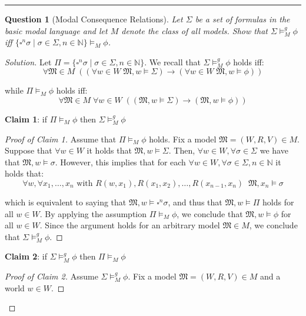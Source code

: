 \documentclass[12pt,a4paper]{report}
\newtheorem{question}{Question}
\theoremstyle{definition}
\newcommand{\N}{\mathbb{N}}                     %
\newcommand{\model}[1]{\mathfrak{#1}}           %
\begin{document}
    \quad

    \hrule

    \quad

    \newpage

    \begin{question}[Modal Consequence Relations]
        Let $\Sigma$ be a set of formulas in the basic modal language and let $M$ denote the class of all models. Show that $\Sigma \models^g_M \phi$ iff $\{\square^n \sigma \mid \sigma \in \Sigma, n \in \N\} \models_M \phi$.
    \end{question}

    \begin{proof}[Solution]
        Let $\Pi = \{\square^n \sigma \mid \sigma \in \Sigma, n \in \N\}$. We recall that $\Sigma \models^g_M \phi$ holds iff:
        \[\forall \model M \in M \; ((\forall w \in W \; \model M, w \models \Sigma) \to (\forall w \in W \; \model M, w \models \phi))\]

        while $\Pi \models_M \phi$ holds iff:
        \[\forall \model M \in M \; \forall w \in W \;((\model M, w \models \Sigma) \to (\model M, w \models \phi))\]

        \textbf{Claim 1}: if $\Pi \models_M \phi$ then $\Sigma \models^g_M \phi$

        \begin{proof}[Proof of Claim 1]
            Assume that $\Pi \models_M \phi$ holds. Fix a model $\model{M} = (W,R,V) \in M$. Suppose that $\forall w \in W$ it holds that $\model M, w \models \Sigma$. Then,  $\forall w \in W, \forall \sigma \in \Sigma$ we have that $\model M, w \models \sigma$. However, this implies that for each $\forall w \in W, \forall \sigma \in \Sigma, n \in \N$ it holds that:
            \[\forall w, \forall x_1, \ldots, x_n \text{ with } R(w,x_1), R(x_1, x_2), \ldots, R(x_{n-1}, x_n) \;\; \model M, x_n \models \sigma\]

            which is equivalent to saying that $\model M, w \models \square^n \sigma$, and thus that $\model M, w \models \Pi$ holds for all $w \in W$. By applying the assumption $\Pi \models_M \phi$, we conclude that $\model M, w \models \phi$ for all $w \in W$. Since the argument holds for an arbitrary model $\model M \in M$, we conclude that $\Sigma \models^g_M \phi$.
        \end{proof}

        \textbf{Claim 2}: if $\Sigma \models^g_M \phi$ then $\Pi \models_M \phi$

        \begin{proof}[Proof of Claim 2]
            Assume $\Sigma \models^g_M \phi$. Fix a model $\model{M} = (W,R, V)\in M$ and a world $w \in W$.


\end{proof}
\end{proof}
\end{document}
